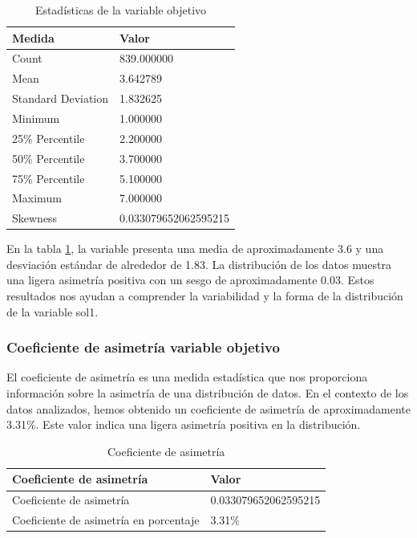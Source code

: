 \begin{table}[H]
    \centering
    \caption{Estadísticas de la variable objetivo}
    \begin{tabular}{ll}
        \hline
        \textbf{Medida}    & \textbf{Valor}       \\
        \hline
        Count              & 839.000000           \\
        Mean               & 3.642789             \\
        Standard Deviation & 1.832625             \\
        Minimum            & 1.000000             \\
        25\% Percentile    & 2.200000             \\
        50\% Percentile    & 3.700000             \\
        75\% Percentile    & 5.100000             \\
        Maximum            & 7.000000             \\
        Skewness           & 0.033079652062595215 \\
        \hline
    \end{tabular}%
    \label{tab:estadistica_variable_sol1}%
\end{table}%

En la tabla \ref{tab:estadistica_variable_sol1}, la variable  presenta una media de aproximadamente 3.6 y una desviación estándar de alrededor de 1.83. La distribución de los datos muestra una ligera asimetría positiva con un sesgo de aproximadamente 0.03. Estos resultados nos ayudan a comprender la variabilidad y la forma de la distribución de la variable sol1.

\subsubsection{Coeficiente de asimetría variable objetivo}

El coeficiente de asimetría es una medida estadística que nos proporciona información sobre la asimetría de una distribución de datos. En el contexto de los datos analizados, hemos obtenido un coeficiente de asimetría de aproximadamente 3.31\%. Este valor indica una ligera asimetría positiva en la distribución.

\begin{table}[H]
    \centering
    \caption{Coeficiente de asimetría}
    \begin{tabular}{ll}
        \hline
        \textbf{Coeficiente de asimetría}      & \textbf{Valor}       \\
        \hline
        Coeficiente de asimetría               & 0.033079652062595215 \\
        Coeficiente de asimetría en porcentaje & 3.31\%               \\
        \hline
    \end{tabular}%
    \label{tab:skewness}%
\end{table}%

